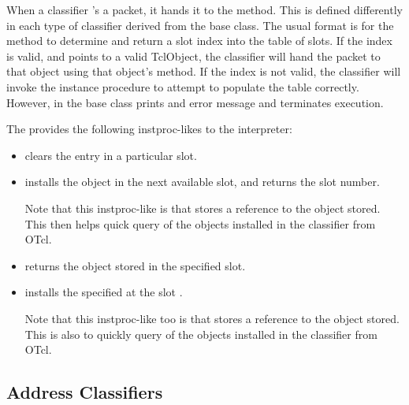 When a classifier 's a packet,
it hands it to the  method.
This is defined differently in each type of classifier
derived from the base class.
The usual format is for the  method to
determine and return a slot index into the table of slots.
If the index is valid, and points to a valid TclObject,
the classifier will hand the packet to that object using 
that object's  method.
If the index is not valid, the classifier will invoke
the instance procedure  to attempt to 
populate the table correctly.
However, in the base class  prints
and error message and terminates execution.

The 
provides the following instproc-likes to the interpreter:
\begin{itemize}\itemsep0pt
\item {} clears the entry in a particular slot.
\item {} installs the object
        in the next available slot, and returns the slot number.

        Note that this instproc-like is 
        that stores a reference to the object stored.
        This then helps quick query of the objects
        installed in the classifier from OTcl.
\item {} returns the object stored in the specified slot.
\item {} installs the specified
         at the slot .

        Note that this instproc-like too is 
        that stores a reference to the object stored.
        This is also to quickly query of the objects
        installed in the classifier from OTcl.
\end{itemize}

\subsection{Address Classifiers}
\label{sec:node:addr-classifier}

